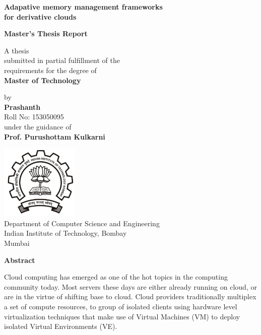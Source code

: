 \documentclass[11pt,a4paper,openright]{report}
\newcommand{\putiitblogo}{\includegraphics[width=10em]{iitb-black}}
\begin{document}
  \begin{titlepage}    
    \begin{center}
   
      \Large \textbf{Adapative memory management frameworks \\for derivative clouds}  \\
      \vspace{5em}
      
      \large \textbf{Master's Thesis Report} \\
      \vspace{5em}
      
      \normalsize A thesis \\submitted in partial fulfillment of the \\requirements for the degree of \\
      \vspace{1em}      
      \large \textbf{Master of Technology} \\
      \vspace{5em}
      
      \normalsize by \\
      \vspace{1em}      
      \large \textbf{Prashanth} \\ 
      \vspace{0.5em}
      \normalsize Roll No: 153050095 \\
      
      \vspace{5em}
      \normalsize under the guidance of \\
      \vspace{0.5em}      
      \large \textbf{Prof. Purushottam Kulkarni} \\
      \vspace{5em}
      
      \putiitblogo \\
      \Large 
      Department of Computer Science and Engineering \\
      Indian Institute of Technology, Bombay \\
      Mumbai
      
    \end{center}
  \end{titlepage} 
  
  \begin{center}
    \huge \textbf{Abstract}
  \end{center}
  \vspace*{3em}
  \normalsize 
    Cloud computing has emerged as one of the hot topics in the computing community today. Most servers these days are either 
already running on cloud, or are in the virtue of shifting base to cloud. Cloud providers traditionally multiplex a set of compute 
resources, to group of isolated clients using hardware level virtualization techniques that make use of Virtual Machines (VM) to deploy 
isolated Virtual Environments (VE). 
\end{document}
